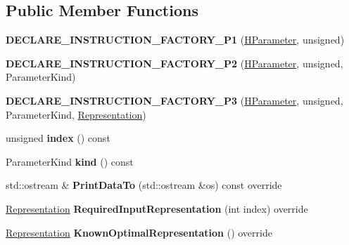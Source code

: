 \subsection*{Public Member Functions}
\begin{DoxyCompactItemize}
\item 
{\bfseries D\+E\+C\+L\+A\+R\+E\+\_\+\+I\+N\+S\+T\+R\+U\+C\+T\+I\+O\+N\+\_\+\+F\+A\+C\+T\+O\+R\+Y\+\_\+\+P1} (\hyperlink{classv8_1_1internal_1_1_h_parameter}{H\+Parameter}, unsigned)\hypertarget{classv8_1_1internal_1_1_h_parameter_ad6e995f231f8b58fe9532240ca7dd2a0}{}\label{classv8_1_1internal_1_1_h_parameter_ad6e995f231f8b58fe9532240ca7dd2a0}

\item 
{\bfseries D\+E\+C\+L\+A\+R\+E\+\_\+\+I\+N\+S\+T\+R\+U\+C\+T\+I\+O\+N\+\_\+\+F\+A\+C\+T\+O\+R\+Y\+\_\+\+P2} (\hyperlink{classv8_1_1internal_1_1_h_parameter}{H\+Parameter}, unsigned, Parameter\+Kind)\hypertarget{classv8_1_1internal_1_1_h_parameter_a677ddfd746bdd91e7e3f86cad1db2add}{}\label{classv8_1_1internal_1_1_h_parameter_a677ddfd746bdd91e7e3f86cad1db2add}

\item 
{\bfseries D\+E\+C\+L\+A\+R\+E\+\_\+\+I\+N\+S\+T\+R\+U\+C\+T\+I\+O\+N\+\_\+\+F\+A\+C\+T\+O\+R\+Y\+\_\+\+P3} (\hyperlink{classv8_1_1internal_1_1_h_parameter}{H\+Parameter}, unsigned, Parameter\+Kind, \hyperlink{classv8_1_1internal_1_1_representation}{Representation})\hypertarget{classv8_1_1internal_1_1_h_parameter_acd55d033efdbbd65d9c71d9a14a19526}{}\label{classv8_1_1internal_1_1_h_parameter_acd55d033efdbbd65d9c71d9a14a19526}

\item 
unsigned {\bfseries index} () const \hypertarget{classv8_1_1internal_1_1_h_parameter_a3051216955dd7910cfa60ea09a989f47}{}\label{classv8_1_1internal_1_1_h_parameter_a3051216955dd7910cfa60ea09a989f47}

\item 
Parameter\+Kind {\bfseries kind} () const \hypertarget{classv8_1_1internal_1_1_h_parameter_a4c68e5786a4c492987e46604702021dc}{}\label{classv8_1_1internal_1_1_h_parameter_a4c68e5786a4c492987e46604702021dc}

\item 
std\+::ostream \& {\bfseries Print\+Data\+To} (std\+::ostream \&os) const  override\hypertarget{classv8_1_1internal_1_1_h_parameter_a6c9bf51b1b26a8f260193ccddb8c5156}{}\label{classv8_1_1internal_1_1_h_parameter_a6c9bf51b1b26a8f260193ccddb8c5156}

\item 
\hyperlink{classv8_1_1internal_1_1_representation}{Representation} {\bfseries Required\+Input\+Representation} (int index) override\hypertarget{classv8_1_1internal_1_1_h_parameter_a03a3e519132fe09a323b961bd51632e7}{}\label{classv8_1_1internal_1_1_h_parameter_a03a3e519132fe09a323b961bd51632e7}

\item 
\hyperlink{classv8_1_1internal_1_1_representation}{Representation} {\bfseries Known\+Optimal\+Representation} () override\hypertarget{classv8_1_1internal_1_1_h_parameter_ae79c259ecdf0f119a284a3c5ae448d95}{}\label{classv8_1_1internal_1_1_h_parameter_ae79c259ecdf0f119a284a3c5ae448d95}

\end{DoxyCompactItemize}
